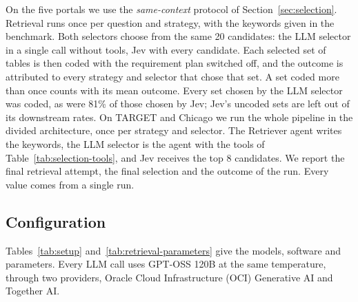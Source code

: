 On the five portals we use the \emph{same-context} protocol of
Section~\ref{sec:selection}. Retrieval runs once per question and strategy,
with the keywords given in the benchmark. Both selectors choose from the same
20 candidates: the LLM selector in a single call without tools, Jev with every
candidate. Each selected set of tables is then coded with the requirement plan
switched off, and the outcome is attributed to every strategy and selector
that chose that set. A set coded more than once counts with its mean outcome.
Every set chosen by the LLM selector was coded, as were 81\% of those chosen
by Jev; Jev's uncoded sets are left out of its downstream rates. On TARGET and
Chicago we run the whole pipeline in the divided architecture, once per
strategy and selector. The Retriever agent writes the keywords, the LLM
selector is the agent with the tools of Table~\ref{tab:selection-tools}, and
Jev receives the top 8 candidates. We report the final retrieval attempt, the
final selection and the outcome of the run. Every value comes from a single
run.

\subsection{Configuration}
\label{sec:configuration}

Tables~\ref{tab:setup} and~\ref{tab:retrieval-parameters} give the models,
software and parameters. Every LLM call uses GPT-OSS 120B at the same
temperature, through two providers, Oracle Cloud Infrastructure (OCI)
Generative AI and Together AI.

